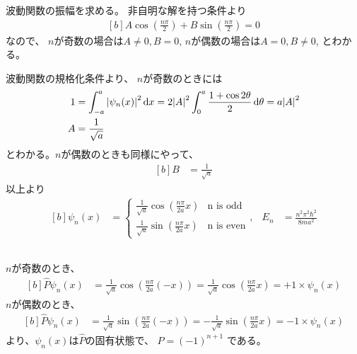 \documentclass[../ap_2023.tex]{subfiles}
\begin{document}
波動関数の振幅を求める。
非自明な解を持つ条件より
\begin{equation}\begin{aligned}[b]
    A\cos(\frac{n\pi}{2})+B\sin(\frac{n\pi}{2})=0
\end{aligned}\end{equation}
なので、
\(n\)が奇数の場合は\(A\neq0,B=0\),
\(n\)が偶数の場合は\(A=0,B\neq0\),
とわかる。

波動関数の規格化条件より、
\(n\)が奇数のときには
\begin{equation}\begin{aligned}[b]
    1 &= \int_{-a}^a \abs{\psi_n(x)}^2\dd{x} =2\abs{A}^2\int_{0}^{a}\frac{1+\cos2\theta}{2}\dd{\theta} = a\abs{A}^2\\
    A &= \frac{1}{\sqrt{a}}
\end{aligned}\end{equation}
とわかる。\(n\)が偶数のときも同様にやって、
\begin{equation}\begin{aligned}[b]
    B &= \frac{1}{\sqrt{a}}
\end{aligned}\end{equation}
以上より
\begin{equation}\begin{aligned}[b]
    \psi_n(x) &= \begin{cases}
        \frac{1}{\sqrt{a}}\cos(\frac{n\pi}{2a}x) & \text{n is odd}\\
        \frac{1}{\sqrt{a}}\sin(\frac{n\pi}{2a}x) & \text{n is even}
    \end{cases}
    ,& E_n &= \frac{n^2\pi^2\hbar^2}{8ma^2}
\end{aligned}\end{equation}

\subsection{}
\(n\)が奇数のとき、
\begin{equation}\begin{aligned}[b]
    \hat{P}\psi_n(x) &= \frac{1}{\sqrt{a}}\cos(\frac{n\pi}{2a}(-x))
    =\frac{1}{\sqrt{a}}\cos(\frac{n\pi}{2a}x)
    = +1\times\psi_n(x)
\end{aligned}\end{equation}
\(n\)が偶数のとき、
\begin{equation}\begin{aligned}[b]
    \hat{P}\psi_n(x) &= \frac{1}{\sqrt{a}}\sin(\frac{n\pi}{2a}(-x))
    =-\frac{1}{\sqrt{a}}\sin(\frac{n\pi}{2a}x)
    = -1\times\psi_n(x)
\end{aligned}\end{equation}
より、\(\psi_n(x)\)は\(\hat{P}\)の固有状態で、
\(P=(-1)^{n+1}\)
である。
\end{document}
